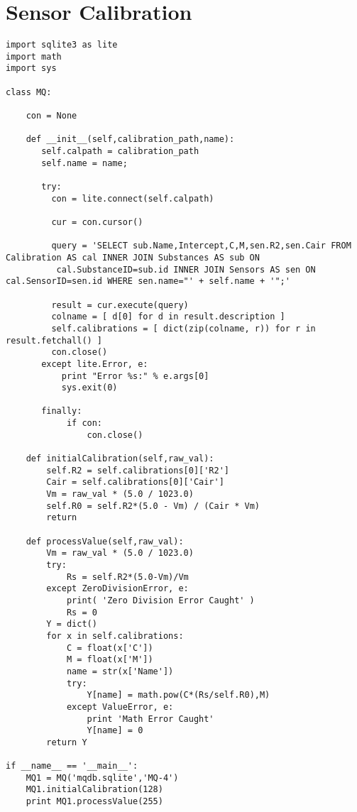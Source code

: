 \section*{Sensor Calibration}
\begin{lstlisting}[breaklines=true,basicstyle=\tiny]
import sqlite3 as lite
import math
import sys

class MQ:

    con = None

    def __init__(self,calibration_path,name):
       self.calpath = calibration_path
       self.name = name;

       try:
         con = lite.connect(self.calpath)

         cur = con.cursor()

         query = 'SELECT sub.Name,Intercept,C,M,sen.R2,sen.Cair FROM Calibration AS cal INNER JOIN Substances AS sub ON
          cal.SubstanceID=sub.id INNER JOIN Sensors AS sen ON cal.SensorID=sen.id WHERE sen.name="' + self.name + '";'

         result = cur.execute(query)
         colname = [ d[0] for d in result.description ]
         self.calibrations = [ dict(zip(colname, r)) for r in result.fetchall() ]
         con.close()
       except lite.Error, e:
           print "Error %s:" % e.args[0]
           sys.exit(0)

       finally:
            if con:
                con.close()

    def initialCalibration(self,raw_val):
        self.R2 = self.calibrations[0]['R2'] 
        Cair = self.calibrations[0]['Cair']
        Vm = raw_val * (5.0 / 1023.0)
        self.R0 = self.R2*(5.0 - Vm) / (Cair * Vm)
        return

    def processValue(self,raw_val):
        Vm = raw_val * (5.0 / 1023.0)
        try:
            Rs = self.R2*(5.0-Vm)/Vm        
        except ZeroDivisionError, e:
            print( 'Zero Division Error Caught' )
            Rs = 0
        Y = dict()
        for x in self.calibrations: 
            C = float(x['C'])
            M = float(x['M'])
            name = str(x['Name'])
            try:
                Y[name] = math.pow(C*(Rs/self.R0),M)
            except ValueError, e:
                print 'Math Error Caught'
                Y[name] = 0
        return Y

if __name__ == '__main__':
    MQ1 = MQ('mqdb.sqlite','MQ-4')
    MQ1.initialCalibration(128)
    print MQ1.processValue(255)
\end{lstlisting}


